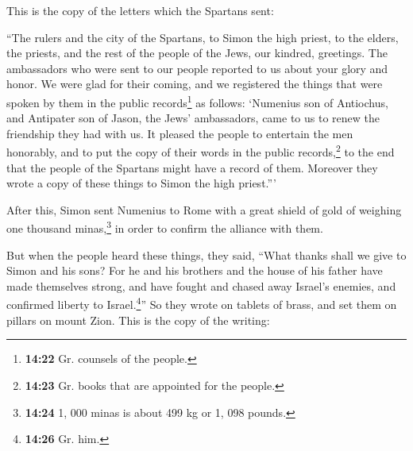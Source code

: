  This is the copy of the letters which the Spartans sent:

``The rulers and the city of the Spartans, to Simon the high priest, to
the elders, the priests, and the rest of the people of the Jews, our
kindred, greetings.  The ambassadors who were sent to our
people reported to us about your glory and honor. We were glad for their
coming,  and we registered the things that were spoken by
them in the public records\footnote{\textbf{14:22} Gr. counsels of the
  people.} as follows: `Numenius son of Antiochus, and Antipater son of
Jason, the Jews' ambassadors, came to us to renew the friendship they
had with us.  It pleased the people to entertain the men
honorably, and to put the copy of their words in the public
records,\footnote{\textbf{14:23} Gr. books that are appointed for the
  people.} to the end that the people of the Spartans might have a
record of them. Moreover they wrote a copy of these things to Simon the
high priest.'''

 After this, Simon sent Numenius to Rome with a great
shield of gold of weighing one thousand minas,\footnote{\textbf{14:24}
  1, 000 minas is about 499 kg or 1, 098 pounds.} in order to confirm
the alliance with them.

 But when the people heard these things, they said,
``What thanks shall we give to Simon and his sons?  For
he and his brothers and the house of his father have made themselves
strong, and have fought and chased away Israel's enemies, and confirmed
liberty to Israel.\footnote{\textbf{14:26} Gr. him.}'' 
So they wrote on tablets of brass, and set them on pillars on mount
Zion. This is the copy of the writing:

